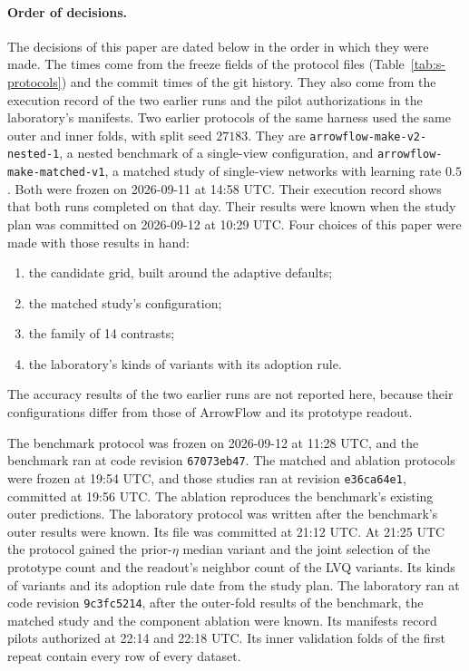 \paragraph{Order of decisions.} The decisions of this paper are dated below in the order in which they were made. The times come from the freeze fields of the protocol files (Table~\ref{tab:s-protocols}) and the commit times of the git history. They also come from the execution record of the two earlier runs and the pilot authorizations in the laboratory's manifests. Two earlier protocols of the same harness used the same outer and inner folds, with split seed $27183$. They are \texttt{arrowflow-make-v2-nested-1}, a nested benchmark of a single-view configuration, and \texttt{arrowflow-make-matched-v1}, a matched study of single-view networks with learning rate $0.5$. Both were frozen on 2026-09-11 at 14:58 UTC. Their execution record shows that both runs completed on that day. Their results were known when the study plan was committed on 2026-09-12 at 10:29 UTC. Four choices of this paper were made with those results in hand:
\begin{enumerate}[leftmargin=2em,topsep=2pt,itemsep=1pt]
\item the candidate grid, built around the adaptive defaults;
\item the matched study's configuration;
\item the family of 14 contrasts;
\item the laboratory's kinds of variants with its adoption rule.
\end{enumerate}
The accuracy results of the two earlier runs are not reported here, because their configurations differ from those of ArrowFlow and its prototype readout.

The benchmark protocol was frozen on 2026-09-12 at 11:28 UTC, and the benchmark ran at code revision \texttt{67073eb47}. The matched and ablation protocols were frozen at 19:54 UTC, and those studies ran at revision \texttt{e36ca64e1}, committed at 19:56 UTC. The ablation reproduces the benchmark's existing outer predictions. The laboratory protocol was written after the benchmark's outer results were known. Its file was committed at 21:12 UTC. At 21:25 UTC the protocol gained the prior-$\eta$ median variant and the joint selection of the prototype count and the readout's neighbor count of the LVQ variants. Its kinds of variants and its adoption rule date from the study plan. The laboratory ran at code revision \texttt{9c3fc5214}, after the outer-fold results of the benchmark, the matched study and the component ablation were known. Its manifests record pilots authorized at 22:14 and 22:18 UTC. Its inner validation folds of the first repeat contain every row of every dataset.

